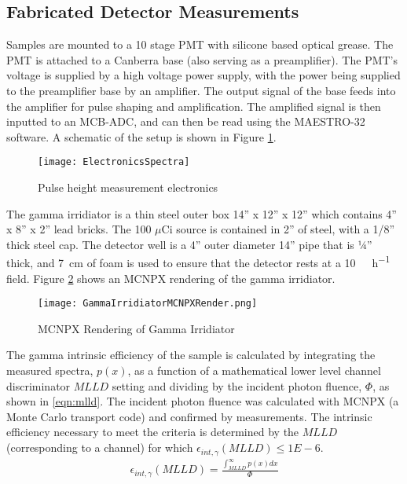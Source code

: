 \documentclass[draftcls,onecolumn]{IEEEtran}
\begin{document}
\subsection{Fabricated Detector Measurements}
Samples are mounted to a 10 stage PMT with silicone based optical grease. 
The PMT is attached to a Canberra base (also serving as a preamplifier). 
The PMT's voltage is supplied by a high voltage power supply, with the power being supplied to the preamplifier base by an amplifier.  
The output signal of the base feeds into the amplifier for pulse shaping and amplification. 
The amplified signal is then inputted to an MCB-ADC, and can then be read using the MAESTRO-32 software. 
A schematic of the setup is shown in Figure \ref{fig:ElectronicsSpectra}.
\begin{figure}
	\centering
	\texttt{[image: ElectronicsSpectra]}
	\caption{Pulse height measurement electronics}
	\label{fig:ElectronicsSpectra}
\end{figure}

The gamma irridiator is a thin steel outer box 14” x 12” x 12” which contains 4” x 8” x 2” lead bricks.  
The 100 $\mu$Ci  source is contained in 2” of steel, with a 1/8” thick steel cap.  
The detector well is a 4” outer diameter 14” pipe that is ¼” thick, and \SI{7}{\cm} of foam is used to ensure that the detector rests at a \SI{10}{\milli\roetgen\per\hour} field. 
Figure \ref{fig:gammaIrridiator} shows an MCNPX rendering of the gamma irridiator.
\begin{figure}[ht]
	\centering
	\texttt{[image: GammaIrridiatorMCNPXRender.png]}
	\caption{MCNPX Rendering of Gamma Irridiator}
	\label{fig:gammaIrridiator}
\end{figure}
The gamma intrinsic efficiency of the sample is calculated by integrating the measured spectra, $p(x)$, as a function of a mathematical lower level channel discriminator $MLLD$ setting and dividing by the incident photon fluence, $\Phi$, as shown in \eqref{eqn:mlld}.
The incident photon fluence was calculated with MCNPX (a Monte Carlo transport code\cite{pelowitz_mcnpx_????}) and confirmed by measurements.
The intrinsic efficiency necessary to meet the criteria is determined by the $MLLD$ (corresponding to a channel) for which $\epsilon_{int,\gamma} \left(MLLD\right) \le \si{1E-6}$.
\begin{align}
	\label{eqn:mlld}
	\epsilon_{int,\gamma} \left(MLLD\right) = \frac{\int_{MLLD}^\infty p(x)dx}{\Phi} 
\end{align}
\end{document}
